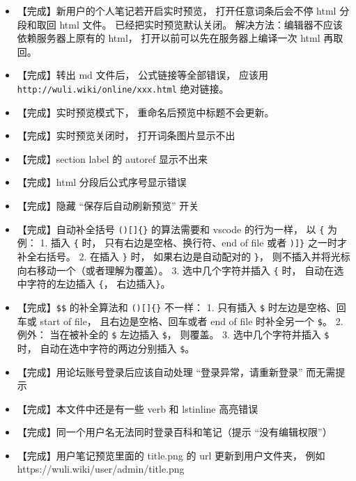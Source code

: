 \begin{itemize}
\item 【完成】新用户的个人笔记若开启实时预览， 打开任意词条后会不停 html 分段和取回 html 文件。 已经把实时预览默认关闭。 解决方法：编辑器不应该依赖服务器上原有的 html， 打开以前可以先在服务器上编译一次 html 再取回。

\item 【完成】转出 md 文件后， 公式链接等全部错误， 应该用 \verb|http://wuli.wiki/online/xxx.html| 绝对链接。

\item 【完成】实时预览模式下， 重命名后预览中标题不会更新。

\item 【完成】实时预览关闭时， 打开词条图片显示不出

\item 【完成】section label 的 autoref 显示不出来

\item 【完成】html 分段后公式序号显示错误

\item 【完成】隐藏 “保存后自动刷新预览” 开关

\item 【完成】自动补全括号 \verb|()[]{}| 的算法需要和 vscode 的行为一样， 以 \verb|{| 为例： 1. 插入 \verb|{| 时， 只有右边是空格、换行符、end of file 或者 \verb|)]}| 之一时才补全右括号。 2.  在插入 \verb|}| 时， 如果右边是自动配对的 \verb|}|， 则不插入并将光标向右移动一个（或者理解为覆盖）。 3. 选中几个字符并插入 \verb|{| 时， 自动在选中字符的左边插入 \verb|{|， 右边插入\verb|}|。

\item 【完成】\verb|$$| 的补全算法和 \verb|()[]{}| 不一样： 1. 只有插入 \verb|$| 时左边是空格、回车或 start of file， 且右边是空格、回车或者 end of file 时补全另一个 \verb|$|。 2. 例外： 当在被补全的 \verb|$| 左边插入 \verb|$|， 则覆盖。 3. 选中几个字符并插入 \verb|$| 时， 自动在选中字符的两边分别插入 \verb|$|。

\item 【完成】用论坛账号登录后应该自动处理 “登录异常，请重新登录” 而无需提示

\item 【完成】本文件中还是有一些 verb 和 lstinline 高亮错误

\item 【完成】同一个用户名无法同时登录百科和笔记（提示 “没有编辑权限”）

\item 【完成】用户笔记预览里面的 title.png 的 url 更新到用户文件夹， 例如 https://wuli.wiki/user/admin/title.png


\end{itemize}
